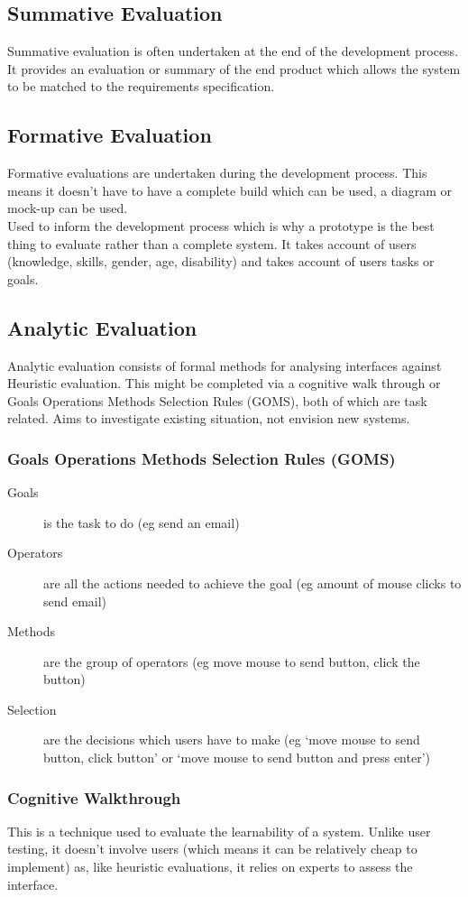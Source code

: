 \subsection{Summative Evaluation}
Summative evaluation is often undertaken at the end of the development process. It provides an evaluation or summary of the end product which allows the system to be matched to the requirements specification.

\subsection{Formative Evaluation}
Formative evaluations are undertaken during the development process. This means it doesn't have to have a complete build which can be used, a diagram or mock-up can be used.\\
Used to inform the development process which is why a prototype is the best thing to evaluate rather than a complete system. It takes account of users (knowledge, skills, gender, age, disability) and takes account of users tasks or goals.

\subsection{Analytic Evaluation}
Analytic evaluation consists of formal methods for analysing interfaces against Heuristic evaluation. This might be completed via a cognitive walk through or Goals Operations Methods Selection Rules (GOMS), both of which are task related. Aims to investigate existing situation, not envision new systems. 
\subsubsection{Goals Operations Methods Selection Rules (GOMS)}
\begin{description}
    \item[Goals] is the task to do (eg send an email)
    \item[Operators] are all the actions needed to achieve the goal (eg amount of mouse clicks to send email)
    \item[Methods] are the group of operators (eg move mouse to send button, click the button) 
    \item[Selection] are the decisions which users have to make (eg `move mouse to send button, click button' or `move mouse to send button and press enter') 
\end{description}
\subsubsection{Cognitive Walkthrough}
This is a technique used to evaluate the learnability of a system. Unlike user testing, it doesn't involve users (which means it can be relatively cheap to implement) as, like heuristic evaluations, it relies on experts to assess the interface.

